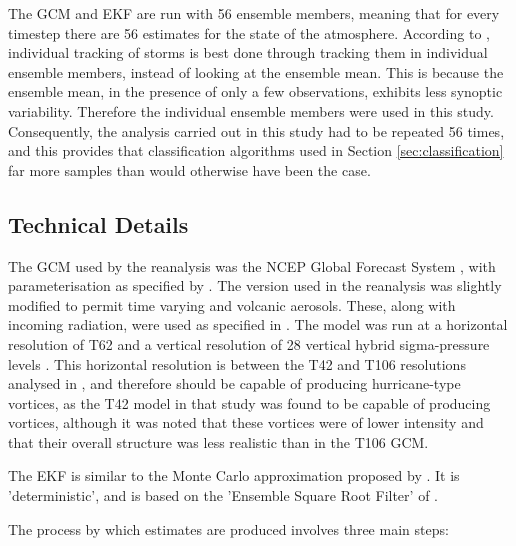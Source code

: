 \documentclass[pdftex,12pt,a4paper]{report}
\begin{document}
The GCM and EKF are run with 56 ensemble members, meaning that for every timestep there are 56
estimates for the state of the atmosphere. According to \textcite{compoTwentieth2011}, individual
tracking of storms is best done through tracking them in individual ensemble members, instead of
looking at the ensemble mean. This is because the ensemble mean, in the presence of only a few
observations, exhibits less synoptic variability. %
Therefore the individual ensemble members were used in this study. Consequently, the analysis
carried out in this study had to be repeated 56 times, and this provides that classification
algorithms used in Section \ref{sec:classification} far more samples than would otherwise have been
the case.

\subsection{Technical Details}

The GCM used by the reanalysis was the NCEP Global Forecast System \parencite{TODOCITE}, with
parameterisation as specified by \textcite{saha2006}. The version used in the reanalysis was
slightly modified to permit time varying  and volcanic aerosols. These, along with incoming
radiation, were used as specified in \textcite{saha2010}. The model was run at a horizontal
resolution of T62 and a vertical resolution of 28 vertical hybrid sigma-pressure levels
\parencite{juang2005}. This horizontal resolution is between the T42 and T106 resolutions analysed
in \textcite{bengtsson1995}, and therefore should be capable of producing hurricane-type vortices,
as the T42 model in that study was found to be capable of producing vortices, although it was noted
that these vortices were of lower intensity and that their overall structure was less realistic than
in the T106 GCM. 

The EKF is similar to the Monte Carlo approximation proposed by \textcite{evensen1994}. It is
'deterministic', and is based on the 'Ensemble Square Root Filter' of \textcite{whitaker2002}.

The process by which estimates are produced involves three main steps: 
\end{document}
